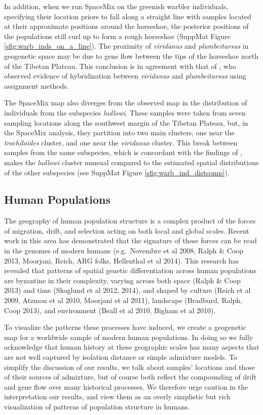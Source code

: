 \documentclass[12pt]{article}
\newcommand{\plrm}[1]{\todo[color=green!20]{#1}}
\newcommand{\plrm}[1]{\plr{#1}}
\newcommand{\plr}[1]{{\it\color{green}{(#1)}}}
\begin{document}
In addition, when we run SpaceMix on the greenish warbler individuals, specifying their location priors to fall along a straight line with samples located at their approximate positions around the horseshoe, the posterior positions of the populations still curl up to form a rough horseshoe (SuppMat Figure \ref{sfig:warb_inds_on_a_line}). The proximity of \textit{viridanus} and \textit{plumbeitarsus} in geogenetic space may be due to gene flow between the tips of the horseshoe north of the Tibetan Plateau. This conclusion is in agreement with that of \citet{alcaide2014genomic}, who observed evidence of hybridization between \textit{viridanus} and \textit{plumbeitarsus} using assignment methods.

The SpaceMix map also diverges from the observed map in the distribution of individuals from the subspecies \textit{ludlowi}.  These samples were taken from seven sampling locations along the southwest margin of the Tibetan Plateau, but, in the SpaceMix analysis, they partition into two main clusters, one near the \textit{trochiloides} cluster, and one near the \textit{viridanus} cluster.  This break between samples from the same subspecies, which is concordant with the findings of \citet{alcaide2014genomic}, makes the \textit{ludlowi} cluster unusual compared to the estimated spatial distributions of the other subspecies (see SuppMat Figure \ref{sfig:warb_ind_distcomp}).
\plrm{add population labels to the text? not sure which is ludlowi.}

%
\subsection*{Human Populations}
The geography of human population structure is a complex product of the forces of migration, drift, and selection acting on both local and global scales.  Recent work in this area has demonstrated that the signature of these forces can be read in the genomes of modern humans (e.g.\ Novembre et al 2008, Ralph \& Coop 2013, Moorjani, Reich, ARG folks, Hellenthal et al 2014).  This research has revealed that patterns of spatial genetic differentiation across human populations are byzantine in their complexity, varying across both space (Ralph \& Coop 2013) and time (Skoglund et al 2012, 2014), and shaped by culture (Reich et al 2009, Atzmon et al 2010, Moorjani et al 2011), landscape (Bradburd, Ralph, Coop 2013), and environment (Beall et al 2010, Bigham et al 2010).  

To visualize the patterns these processes have induced, we create a geogenetic map for a worldwide sample of modern human populations. In doing so we fully acknowledge that human history at these geographic scales has many aspects that are not well captured by isolation distance or simple admixture models. To simplify the discussion of our results, we talk about samples' locations and those of their sources of admixture, but of course both reflect the compounding of drift and gene flow over many historical processes.  We therefore urge caution in the interpretation our results, and view them as an overly simplistic but rich visualization of patterns of population structure in humans.
\end{document}
